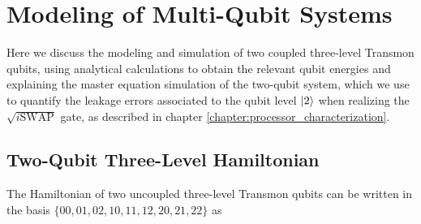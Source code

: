 \chapter{Modeling of Multi-Qubit Systems} 

Here we discuss the modeling and simulation of two coupled three-level Transmon qubits, using analytical calculations to obtain the relevant qubit energies and explaining the master equation simulation of the two-qubit system, which we use to quantify the leakage errors associated to the qubit level $\left| 2 \right>$ when realizing the $\sqrt{i\mathrm{SWAP}}$ gate, as described in chapter \ref{chapter:processor_characterization}.

\section{Two-Qubit Three-Level Hamiltonian} \label{section:three_level_simulation}

The Hamiltonian of two uncoupled three-level Transmon qubits can be written in the basis $\{00,01,02,10,11,12,20,21,22\}$ as

